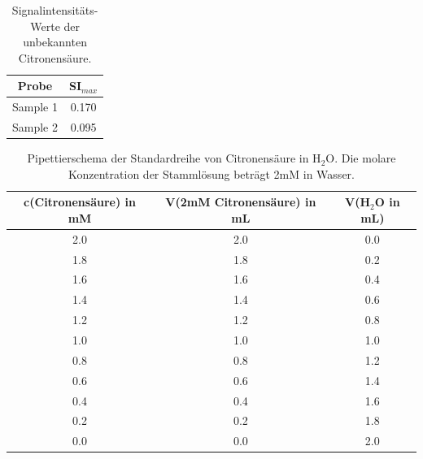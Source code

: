 \documentclass[10pt,a4paper]{article}
\begin{document}
			\begin{table}[H]
			\centering
			\caption{Signalintensitäts-Werte der unbekannten Citronensäure.}
			\label{tab: SI_unknownsample}
				\begin{tabular}{cc}
						\toprule
						Probe & SI$_{max}$\\
						\midrule
						Sample 1 & 0.170\\
						Sample 2 & 0.095\\
						\bottomrule
				\end{tabular}
			\end{table}			
		
			\begin{table}[H]
				\centering
				\caption{Pipettierschema der Standardreihe von Citronensäure in H$_2$O. Die molare Konzentration der Stammlösung beträgt 2mM in Wasser.}
				\label{tab:pipettierschema Standardreihe}
				\begin{tabular}{ccc}
					\toprule
					c(Citronensäure) in mM &V(2mM Citronensäure) in mL & V(H$_2$O in mL)\\
					\midrule
					2.0 & 2.0 & 0.0\\
					1.8 & 1.8 & 0.2\\
					1.6 & 1.6 & 0.4 \\
					1.4 & 1.4 & 0.6 \\
					1.2 & 1.2 & 0.8\\
					1.0 & 1.0 & 1.0 \\
					0.8 & 0.8 & 1.2\\
					0.6 & 0.6 & 1.4\\
					0.4 & 0.4 & 1.6 \\
					0.2 & 0.2 & 1.8 \\
					0.0 & 0.0 & 2.0\\
					\bottomrule
				\end{tabular}
			\end{table}	
	
	
	\nocite{*}
	
	\newpage
	
	
\end{document}
